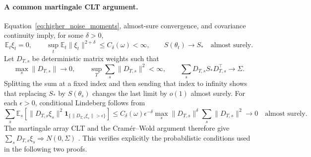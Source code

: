 \paragraph{A common martingale CLT argument.}
Equation~\eqref{eq:higher_noise_moments}, almost-sure convergence, and covariance continuity imply, for some
$\delta>0$,
\[
\mathbb E_t\xi_t=0,\qquad
\sup_t\mathbb E_t\|\xi_t\|^{2+\delta}\le C_\delta(\omega)<\infty,\qquad
S(\theta_t)\longrightarrow S_*\quad\text{almost surely}.
\]
Let $D_{T,s}$ be deterministic matrix weights such that
\begin{equation}\label{eq:weight_conditions}
\max_s\|D_{T,s}\|\to0,\qquad
\sup_T\sum_s\|D_{T,s}\|^2<\infty,\qquad
\sum_sD_{T,s}S_*D_{T,s}^\top\to\Sigma.
\end{equation}
Splitting the sum at a fixed index and then sending that index to infinity
shows that replacing $S_*$ by $S(\theta_s)$ changes the last limit by
$o(1)$ almost surely. For each $\epsilon>0$, conditional Lindeberg follows
from
\[
\sum_s\mathbb E_s\!\left[
\|D_{T,s}\xi_s\|^2\mathbf1_{\{\|D_{T,s}\xi_s\|>\epsilon\}}\right]
\le C_\delta(\omega)\epsilon^{-\delta}
\max_s\|D_{T,s}\|^\delta\sum_s\|D_{T,s}\|^2\longrightarrow0\quad\text{almost surely}.
\]
The martingale array CLT and the Cram\'er--Wold argument therefore give
$\sum_sD_{T,s}\xi_s\Rightarrow N(0,\Sigma)$
\cite[Chapter~3]{hallheyde1980}. This verifies explicitly the probabilistic
conditions used in the following two proofs.

